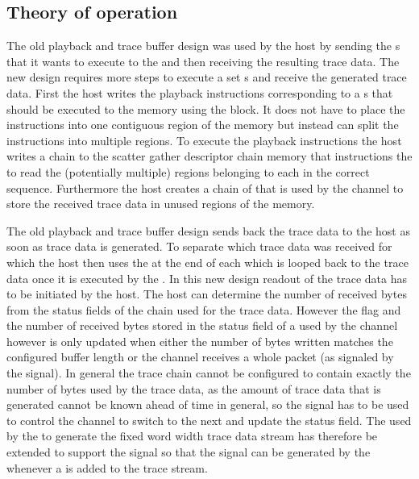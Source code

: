 \subsection{Theory of operation}
The old playback and trace buffer design was used by the host by sending the \PlaybackProgram{}s that it wants to execute to the \FPGA{} and then receiving the resulting trace data.
The new design requires more steps to execute a set \PlaybackProgram{}s and receive the generated trace data.
First the host writes the playback instructions corresponding to a \PlaybackProgram{}s that should be executed to the \DDR{} memory using the \FAXI{} block. It does not have to place the instructions into one contiguous region of the memory but instead can split the instructions into multiple regions.
To execute the playback instructions the host writes a \descriptor{} chain to the scatter gather descriptor chain memory that instructions the \AXIDMA{} to read the (potentially multiple) regions belonging to each \PlaybackProgram{} in the correct sequence.
Furthermore the host creates a chain of \descriptor{} that is used by the \SToMM{} channel to store the received trace data in unused regions of the \DDR{} memory.

The old playback and trace buffer design sends back the trace data to the host as soon as trace data is generated. To separate which trace data was received for which \PlaybackProgram{} the host then uses the \haltInstr{} at the end of each \PlaybackProgram{} which is looped back to the trace data once it is executed by the \pbexec{}.
In this new design readout of the trace data has to be initiated by the host. The host can determine the number of received bytes from the status fields of the \descriptor{} chain used for the trace data.
However the \completed{} flag and the number of received bytes stored in the status field of a \descriptor{} used by the \SToMM{} channel however is only updated when either the number of bytes written matches the configured buffer length or the \SToMM{} channel receives a whole packet (as signaled by the \TLAST{} signal). In general the trace \descriptor{} chain cannot be configured to contain exactly the number of bytes used by the trace data, as the amount of trace data that is generated cannot be known ahead of time in general, so the \TLAST{} signal has to be used to control the \SToMM{} channel to switch to the next \descriptor{} and update the status field.
The \UTEncoder{} used by the \pbexec{} to generate the fixed word width trace data stream has therefore be extended to support the \TLAST{} signal so that the \TLAST{} signal can be generated by the \pbexec{} whenever a \haltInstr{} is added to the trace stream.

